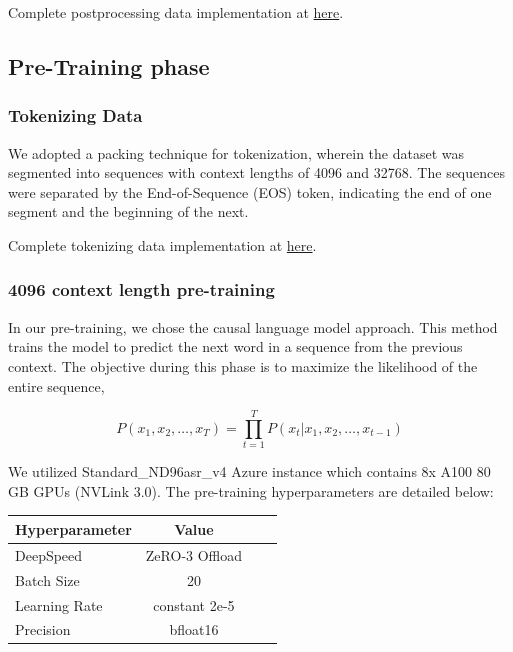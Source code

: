 \documentclass[preprint]{article}
\begin{document}
Complete postprocessing data implementation at \href{https://github.com/malaysia-ai/dedup-text-dataset?tab=readme-ov-file#postprocessing}{here}.


\subsection{Pre-Training phase}

\subsubsection{Tokenizing Data}

We adopted a packing technique for tokenization, wherein the dataset was segmented into sequences with context lengths of 4096 and 32768. The sequences were separated by the End-of-Sequence (EOS) token, indicating the end of one segment and the beginning of the next.

Complete tokenizing data implementation at \href{https://github.com/malaysia-ai/dedup-text-dataset/tree/main/mistral}{here}.

\subsubsection{4096 context length pre-training}\label{sec:4096-pretrained}

In our pre-training, we chose the causal language model approach. This method trains the model to predict the next word in a sequence from the previous context. The
objective during this phase is to maximize the likelihood of the entire sequence,

\[
  P(x_1, x_2, \ldots, x_T) = \prod_{t=1}^{T} P(x_t | x_1, x_2, \ldots, x_{t-1})
\]

We utilized Standard\_ND96asr\_v4 Azure instance which contains 8x A100 80 GB GPUs (NVLink 3.0). The pre-training hyperparameters are detailed below:

\begin{table}[h]
  \centering
  \begin{tabular}{lccl}
    \hline
    \textbf{Hyperparameter} & \textbf{Value} \\
    \hline
    DeepSpeed               & ZeRO-3 Offload \\
    Batch Size              & 20             \\
    Learning Rate           & constant 2e-5  \\
    Precision               & bfloat16       \\
    \hline
  \end{tabular}
\end{table}
\end{document}
